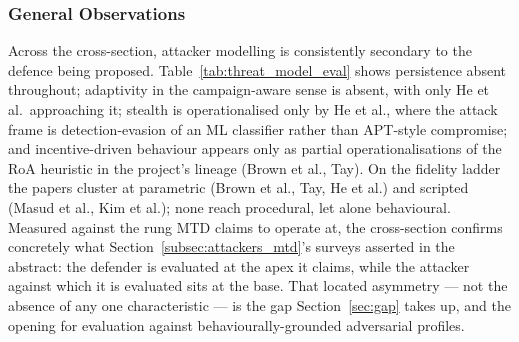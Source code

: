 \subsubsection{General Observations}

Across the cross-section, attacker modelling is consistently secondary to the defence being proposed. Table~\ref{tab:threat_model_eval} shows persistence absent throughout; adaptivity in the campaign-aware sense is absent, with only He et al.\ approaching it; stealth is operationalised only by He et al., where the attack frame is detection-evasion of an ML classifier rather than APT-style compromise; and incentive-driven behaviour appears only as partial operationalisations of the RoA heuristic in the project's lineage (Brown et al., Tay). On the fidelity ladder the papers cluster at parametric (Brown et al., Tay, He et al.) and scripted (Masud et al., Kim et al.); none reach procedural, let alone behavioural. Measured against the rung MTD claims to operate at, the cross-section confirms concretely what Section~\ref{subsec:attackers_mtd}'s surveys asserted in the abstract: the defender is evaluated at the apex it claims, while the attacker against which it is evaluated sits at the base. That located asymmetry --- not the absence of any one characteristic --- is the gap Section~\ref{sec:gap} takes up, and the opening for evaluation against behaviourally-grounded adversarial profiles.